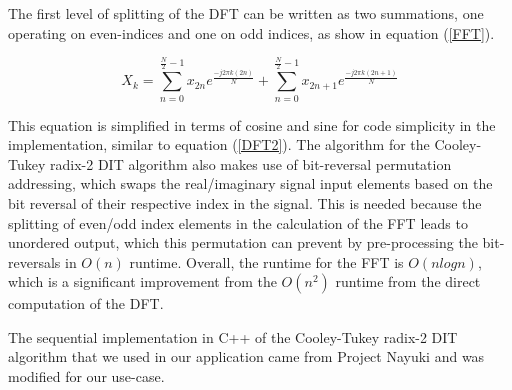 \documentclass[journal]{IEEEtran}
\begin{document}
	\par{
		The first level of splitting of the DFT
		can be written as two summations, one
		operating on even-indices and one on 
		odd indices, as show in equation (\ref{FFT}).

		\begin{equation}\label{FFT}
			\displaystyle X_k = \sum_{n=0}^{\frac{N}{2} - 1}x_{2n}e^{\displaystyle\frac{-j2\pi k(2n)}{N}}
			+ \sum_{n=0}^{\frac{N}{2} - 1}x_{2n + 1}e^{\displaystyle\frac{-j2\pi k(2n + 1)}{N}}
		\end{equation}
	}

	\par{
		This equation is simplified in terms of cosine and sine for code
		simplicity in the implementation, similar to equation (\ref{DFT2}).
		The algorithm for the Cooley-Tukey radix-2 DIT algorithm also makes
		use of bit-reversal permutation addressing, which swaps the
		real/imaginary signal input elements based on the bit reversal of their
		respective index in the signal. This is needed because the splitting
		of even/odd index elements in the calculation of the FFT leads to 
		unordered output, which this permutation can prevent by pre-processing
		the bit-reversals in $O(n)$ runtime. Overall, the runtime for the
		FFT is $O(nlogn)$, which is a significant improvement from the $O(n^2)$
		runtime from the direct computation of the DFT.

		The sequential implementation in C++ of the Cooley-Tukey radix-2 DIT
		algorithm that we used in our application came from Project Nayuki 
		\cite{Nayuki} and was modified for our use-case.
	}
\end{document}

